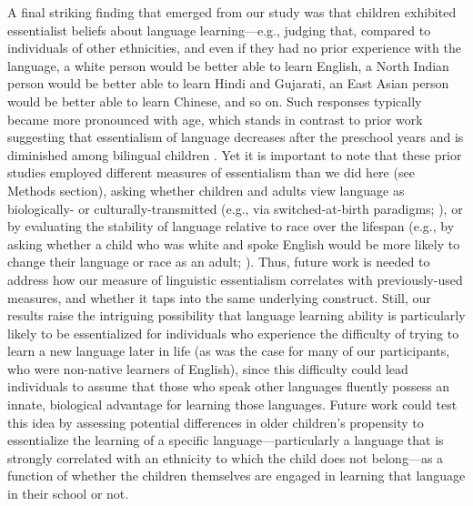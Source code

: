 \documentclass{foushee-adapted-preprint}
\begin{document}
A final striking finding that emerged from our study was that children exhibited essentialist beliefs about language learning---e.g., judging that, compared to individuals of other ethnicities, and even if they had no prior experience with the language, a white person would be better able to learn English, a North Indian person would be better able to learn Hindi and Gujarati, an East Asian person would be better able to learn Chinese, and so on. Such responses typically became more pronounced with age, which stands in contrast to prior work suggesting that essentialism of language decreases after the preschool years \parencite{kinzler2012children} and is diminished among bilingual children \parencite{byers2015bilingualism, dautel2018once}. Yet it is important to note that these prior studies employed different measures of essentialism than we did here (see Methods section), asking whether children and adults view language as biologically- or culturally-transmitted (e.g., via switched-at-birth paradigms; \cite{hirschfeld1997young, sun2023essentialist, byers2015bilingualism}), or by evaluating the stability of language relative to race over the lifespan (e.g., by asking whether a child who was white and spoke English would be more likely to change their language or race as an adult; \cite{kinzler2012children, dautel2018once}). Thus, future work is needed to address how our measure of linguistic essentialism correlates with previously-used measures, and whether it taps into the same underlying construct. Still, our results raise the intriguing possibility that language learning ability is particularly likely to be essentialized for individuals who experience the difficulty of trying to learn a new language later in life (as was the case for many of our participants, who were non-native learners of English), since this difficulty could lead individuals to assume that those who speak other languages fluently possess an innate, biological advantage for learning those languages. Future work could test this idea by assessing potential differences in older children's propensity to essentialize the learning of a specific language---particularly a language that is strongly correlated with an ethnicity to which the child does not belong---as a function of whether the children themselves are engaged in learning that language in their school or not. %
\end{document}
